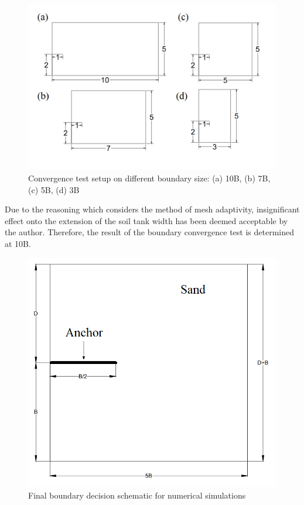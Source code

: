 \documentclass[a4paper, nobind]{templates/ociamthesis}
\begin{document}
\begin{figure}[H]
\includegraphics[width=1\linewidth]{myfigureeeeee/boundary} \caption{Convergence test setup on different boundary size: (a) 10B, (b) 7B, (c) 5B, (d) 3B}\label{fig:unnamed-chunk-19}
\end{figure}

Due to the reasoning which considers the method of mesh adaptivity, insignificant effect onto the extension of the soil tank width has been deemed acceptable by the author. Therefore, the result of the boundary convergence test is determined at 10B.

\begin{figure}[H]
\includegraphics[width=1\linewidth]{myfigureeeeee/boundary convergence2} \caption{Final boundary decision schematic for numerical simulations}\label{fig:unnamed-chunk-20}
\end{figure}
\end{document}
